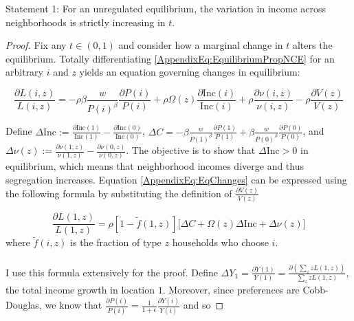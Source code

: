 \documentclass[12pt]{article}
\begin{document}
	\begin{enumerate}
		\item Statement 1: For an unregulated equilibrium, the variation in income across neighborhoods is strictly increasing in $t$. 
		
		\begin{proof}
		 \item Fix any $t \in (0, 1)$ and consider how a marginal change in $t$ alters the equilibrium. Totally differentiating \eqref{AppendixEq:EquilibriumPropNCE} for an arbitrary $i$ and $z$ yields an equation governing changes in equilibrium:
		 
		 \begin{equation}\label{AppendixEq:EqChanges}
		 	 \frac{\partial L(i, z)}{L(i, z)} = -\rho \beta \frac{w}{P(i)^{\beta}}\frac{\partial P(i)}{P(i)} + \rho\Omega(z) \frac{\partial \text{Inc}(i)}{\text{Inc}(i)} + \rho\frac{\partial \nu(i, z)}{\nu(i, z)}  - \rho \frac{\partial V(z)}{V(z)}
		 \end{equation}
		 
		 Define $\Delta \text{Inc} := \frac{\partial \text{Inc}(1)}{\text{Inc}(1)} - \frac{\partial \text{Inc}(0)}{\text{Inc}(0)}$, $\Delta C = -\beta\frac{w}{P(1)^{\beta}}\frac{\partial P(1)}{P(1)} + \beta\frac{w}{P(0)^{\beta}}\frac{\partial P(0)}{P(0)}$, and $\Delta \nu(z) := \frac{\partial \nu(1, z)}{\nu(1, z)} - \frac{\partial \nu(0, z)}{\nu(0, z)}$. The objective is to show that $\Delta \text{Inc} > 0$ in equilibrium, which means that neighborhood incomes diverge and thus segregation increases. Equation \eqref{AppendixEq:EqChanges} can be expressed using the following formula by substituting the definition of $\frac{\partial V(z)}{V(z)}$
		
		 \begin{equation}\label{AppendixEq:PopulationFormula}
		 	\frac{\partial L(1, z)}{L(1, z)} = \rho[1 - \tilde{f}(1, z)]\big[ \Delta C + \Omega(z)\Delta \text{Inc} + \Delta \nu(z) \big]
		 \end{equation}
		 where $\tilde{f}(i, z)$ is the fraction of type $z$ households who choose $i$. 
		 
		 \paragraph*{}
		 I use this formula extensively for the proof. Define $\Delta Y_{1} = \frac{\partial Y(1)}{Y(1)} =  \frac{\partial (\sum_{z}zL(1, z))}{\sum_{z}zL(1, z)}$, the total income growth in location $1$. Moreover, since preferences are Cobb-Douglas, we know that $\frac{\partial P(i)}{P(i)} = \frac{1}{1 + \epsilon}\frac{\partial Y(i)}{Y(i)}$ and so 
		 

\end{proof}
\end{enumerate}
\end{document}
